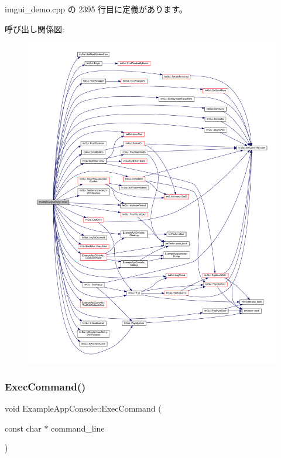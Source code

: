  imgui\+\_\+demo.\+cpp の 2395 行目に定義があります。

呼び出し関係図\+:\nopagebreak
\begin{figure}[H]
\begin{center}
\leavevmode
\includegraphics[width=350pt]{struct_example_app_console_a0518a09c7e8648dd52c7c06df19ac17a_cgraph}
\end{center}
\end{figure}
\mbox{\label{struct_example_app_console_aa1e8bf1f3795cbc41597e1ff081c6589}} 
\subsubsection{\texorpdfstring{Exec\+Command()}{ExecCommand()}}
{\footnotesize\ttfamily void Example\+App\+Console\+::\+Exec\+Command (\begin{DoxyParamCaption}\item[{const char $\ast$}]{command\+\_\+line }\end{DoxyParamCaption})\hspace{0.3cm}{\ttfamily [inline]}}



